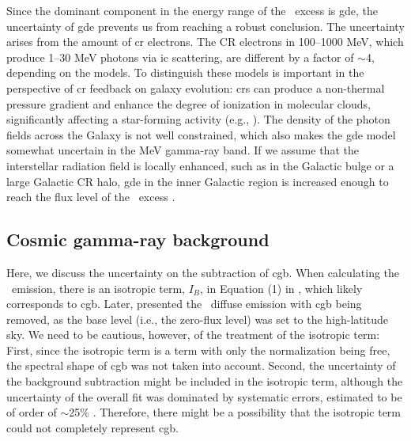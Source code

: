 \documentclass[a4paper,11pt]{article}
\begin{document}
Since the dominant component in the energy range of the \comptel\ excess is \ac{gde}, the uncertainty of \ac{gde} prevents us from reaching a robust conclusion.
The uncertainty arises from the amount of \ac{cr} electrons.
The CR electrons in 100--1000 MeV, which produce 1--30 MeV photons via \ac{ic} scattering, are different by a factor of $\sim$4, depending on the models. 
To distinguish these models is important in the perspective of \ac{cr} feedback on galaxy evolution:
\acp{cr} can produce a non-thermal pressure gradient and enhance the degree of ionization in molecular clouds, significantly affecting a star-forming activity
(e.g., \cite{hopkins_first_2021}). 
The density of the photon fields across the Galaxy is not well constrained, which also makes the \ac{gde} model somewhat uncertain in the MeV gamma-ray band.
If we assume that the interstellar radiation field is locally enhanced, such as in the Galactic bulge or a large Galactic CR halo, \ac{gde} in the inner Galactic region is increased enough to reach the flux level of the \comptel\ excess \citep{bouchet_diffuse_2011}.



\subsection{Cosmic gamma-ray background}
\label{sec:cgb}

Here, we discuss the uncertainty on the subtraction of \ac{cgb}.
When calculating the \comptel\ emission, there is an isotropic term, $I_B$, in Equation (1) in \cite{strong_diffuse_1994,strong_diffuse_1996}, which likely corresponds to \ac{cgb}.
Later, \cite{strong_comptel_1999,strong_diffuse_2004,bouchet_diffuse_2011} presented the \comptel\ diffuse emission with \ac{cgb} being removed, as the base level (i.e., the zero-flux level) was set to the high-latitude sky.
We need to be cautious, however, of the treatment of the isotropic term: 
First, since the isotropic term is a term with only the normalization being free, the spectral shape of \ac{cgb} was not taken into account. 
Second, the uncertainty of the background subtraction might be included in the isotropic term, although the uncertainty of the overall fit was dominated by systematic errors, estimated to be of order of $\sim$25\%  \citep{strong_diffuse_1994}. 
Therefore, there might be a possibility that the isotropic term could not completely represent \ac{cgb}.
\end{document}
